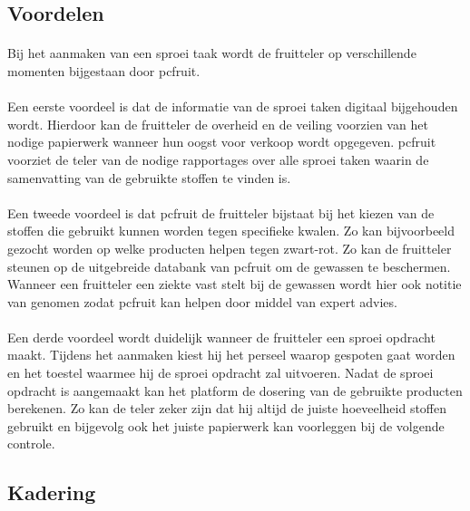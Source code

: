 \subsection {Voordelen}

\paragraph {} Bij het aanmaken van een sproei taak wordt de fruitteler op verschillende
momenten bijgestaan door pcfruit.

\paragraph {} Een eerste voordeel is dat de informatie van de sproei taken digitaal
bijgehouden wordt.  Hierdoor kan de fruitteler de overheid en de veiling voorzien van het
nodige papierwerk wanneer hun oogst voor verkoop wordt opgegeven. pcfruit voorziet de
teler van de nodige rapportages over alle sproei taken waarin de samenvatting van de
gebruikte stoffen te vinden is.

\paragraph {} Een tweede voordeel is dat pcfruit de fruitteler bijstaat bij het kiezen van de
stoffen die gebruikt kunnen worden tegen specifieke kwalen. Zo kan bijvoorbeeld gezocht
worden op welke producten helpen tegen zwart-rot. Zo kan de fruitteler steunen op de
uitgebreide databank van pcfruit om de gewassen te beschermen. Wanneer een fruitteler een
ziekte vast stelt bij de gewassen wordt hier ook notitie van genomen zodat pcfruit kan
helpen door middel van expert advies.

\paragraph {} Een derde voordeel wordt duidelijk wanneer de fruitteler een sproei opdracht
maakt. Tijdens het aanmaken kiest hij het perseel waarop gespoten gaat worden en het
toestel waarmee hij de sproei opdracht zal uitvoeren. Nadat de sproei opdracht is
aangemaakt kan het platform de dosering van de gebruikte producten berekenen. Zo kan de
teler zeker zijn dat hij altijd de juiste hoeveelheid stoffen gebruikt en bijgevolg ook
het juiste papierwerk kan voorleggen bij de volgende controle.


\subsection {Kadering}

